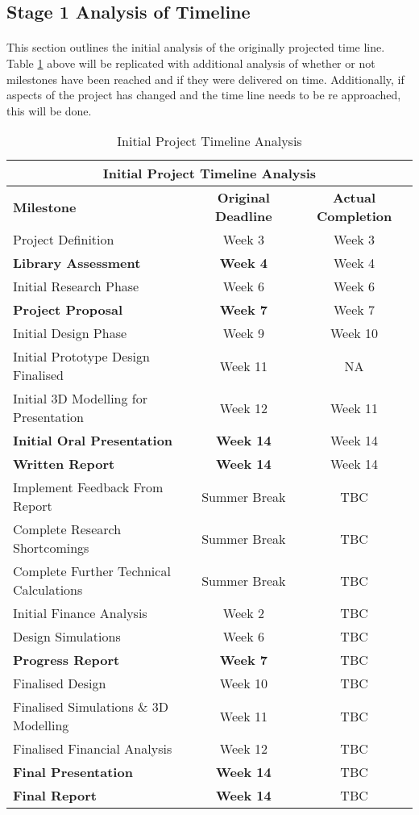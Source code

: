 \subsection{Stage 1 Analysis of Timeline}

\paragraph{}
This section outlines the initial analysis of the originally projected time line. Table \ref{table:milestones_2} above will be replicated with additional analysis of whether or not milestones have been reached and if they were delivered on time. Additionally, if aspects of the project has changed and the time line needs to be re approached, this will be done.  

\begin{table}[H]
\centering
\begin{tabular}{||p{5cm} c c||} 
 \hline
 \multicolumn{3}{|c|}{\textbf{Initial Project Timeline Analysis}} \\ \hline\hline
 \textbf{Milestone} & \textbf{Original Deadline} & \textbf{Actual Completion} \\ [0.5ex] 
 \hline\hline
 Project Definition & Week 3 & Week 3\\ 
 \textbf{Library Assessment} & \textbf{Week 4} & Week 4\\
 Initial Research Phase & Week 6 & Week 6\\
 \textbf{Project Proposal} & \textbf{Week 7} & Week 7\\
 Initial Design Phase & Week 9 & Week 10\\
 Initial Prototype Design Finalised & Week 11 & NA\\
 Initial 3D Modelling for Presentation & Week 12 & Week 11\\ 
 \textbf{Initial Oral Presentation} & \textbf{Week 14} & Week 14\\
 \textbf{Written Report} & \textbf{Week 14} & Week 14\\ 
 Implement Feedback From Report & Summer Break & TBC \\
 Complete Research Shortcomings & Summer Break & TBC \\
 Complete Further Technical Calculations & Summer Break & TBC \\
 Initial Finance Analysis & Week 2 & TBC \\
 Design Simulations & Week 6 & TBC \\ 
 \textbf{Progress Report} & \textbf{Week 7} & TBC \\
 Finalised Design & Week 10 & TBC \\
 Finalised Simulations \& 3D Modelling & Week 11 & TBC \\
 Finalised Financial Analysis & Week 12 & TBC \\ 
 \textbf{Final Presentation} & \textbf{Week 14} & TBC\\
 \textbf{Final Report} & \textbf{Week 14} & TBC\\ [1ex] 
 \hline
\end{tabular}
\caption{Initial Project Timeline Analysis}
\label{table:milestones_2}
\end{table}      


